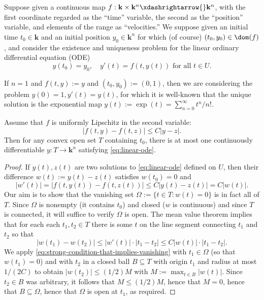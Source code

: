 \documentclass[reqno]{amsart} 
\begin{document}
Suppose given a
continuous
map
$f : \mathbf{k} \times \mathbf{k}^n \xdashrightarrow{}
\mathbf{k}^n$,
with the first coordinate regarded as the ``time'' variable,
the second as the ``position'' variable, and elements of the range as ``velocities.''
We suppose given an initial time $t_0 \in \mathbf{k}$ and an initial position $y_0 \in \mathbf{k}^n$ 
for which (of course)
$(t_0,y_0) \in \dom(f)$,
and consider the existence and uniqueness
problem for the linear ordinary differential equation (ODE)
\begin{equation}\label{eq:linear-ode}
  y(t_0) = y_0,
  \quad
  y'(t) = f(t,y(t))
  \text{ for all } t \in U.
\end{equation}
\begin{example}
  If $n = 1$
  and $f(t,y) := y$
  and $(t_0,y_0) := (0,1)$,
  then we are considering
  the problem $y(0) = 1, y'(t) = y(t)$,
  for which it is well-known that the unique solution
  is the exponential map $y(t) := \exp(t) = \sum_{n=0}^{\infty} t^n/n!$.
\end{example}
\begin{theorem}
[Uniqueness]
  Assume that $f$ is uniformly Lipschitz in the second
  variable:
  \begin{equation*}
  |f(t,y) - f(t,z)| \leq C |y - z|.
  \end{equation*}
  Then for any convex open set $T$ containing
  $t_0$,
  there is at most one continuously differentiable
  $y : T \rightarrow \mathbf{k}^n$ satisfying
  \eqref{eq:linear-ode}.
\end{theorem}
\begin{proof}
  If $y(t), z(t)$ are two solutions to \eqref{eq:linear-ode}
  defined on $U$,
  then
  their difference
  $w(t) := y(t) - z(t)$
  satisfies
  $w(t_0) = 0$
  and
  \begin{equation*}
|w'(t)| = |f(t,y(t)) - f(t,z(t))| \leq
  C |y(t) - z(t)| = C |w(t)|.
\end{equation*}
  Our aim is to show that the vanishing set $\Omega := \{t \in T : w(t) =
  0\}$
  is in fact all of $T$.
  Since $\Omega$ is nonempty (it contains $t_0$)
  and closed ($w$ is continuous)
  and since $T$ is connected,
  it will suffice to verify $\Omega$ is open.
  The mean value theorem
  implies that for each each $t_1,t_2 \in T$
  there is some $t$
  on the line segment connecting $t_1$ and $t_2$
  so that
  \begin{equation}\label{eq:strong-condition-that-implies-vanishing}
    |w(t_1) - w(t_2)| \leq |w'(t)| \cdot |t_1
    - t_2| \leq C |w(t)| \cdot |t_1 - t_2|.
  \end{equation}
  We apply \eqref{eq:strong-condition-that-implies-vanishing}
  with $t_1 \in \Omega$  (so that $w(t_1) = 0$)
  and with $t_2$ in a closed ball $B \subseteq T$ with origin $t_1$
  and radius at most $1/(2 C)$
  to obtain
  $|w(t_2)| \leq (1/2) M$ with $M := \max_{t \in B} |w(t)|$.
  Since $t_2 \in B$ was arbitrary, it follows that $M \leq (1/2) M$,
  hence that $M = 0$,  hence that $B \subseteq \Omega$,
  hence that $\Omega$ is open at $t_1$, as required.
\end{proof}
\end{document}
